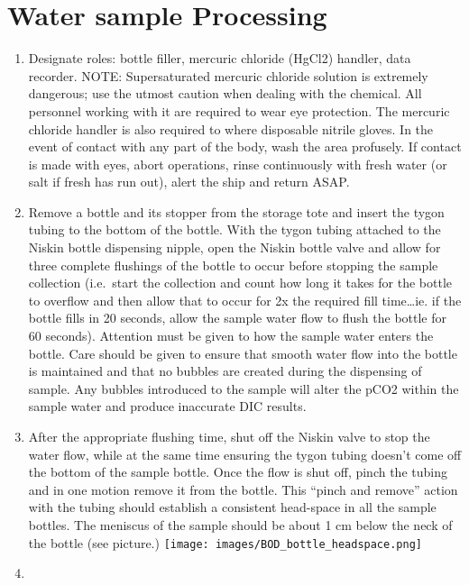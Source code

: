 \documentclass[]{book}
\begin{document}
\section{Water sample Processing}\label{water-sample-processing}

\begin{enumerate}
\def\labelenumi{\arabic{enumi}.}
\item
  Designate roles: bottle filler, mercuric chloride (HgCl2) handler,
  data recorder. NOTE: Supersaturated mercuric chloride solution is
  extremely dangerous; use the utmost caution when dealing with the
  chemical. All personnel working with it are required to wear eye
  protection. The mercuric chloride handler is also required to where
  disposable nitrile gloves. In the event of contact with any part of
  the body, wash the area profusely. If contact is made with eyes, abort
  operations, rinse continuously with fresh water (or salt if fresh has
  run out), alert the ship and return ASAP.
\item
  Remove a bottle and its stopper from the storage tote and insert the
  tygon tubing to the bottom of the bottle. With the tygon tubing
  attached to the Niskin bottle dispensing nipple, open the Niskin
  bottle valve and allow for three complete flushings of the bottle to
  occur before stopping the sample collection (i.e.~start the collection
  and count how long it takes for the bottle to overflow and then allow
  that to occur for 2x the required fill time\ldots{}ie. if the bottle
  fills in 20 seconds, allow the sample water flow to flush the bottle
  for 60 seconds). Attention must be given to how the sample water
  enters the bottle. Care should be given to ensure that smooth water
  flow into the bottle is maintained and that no bubbles are created
  during the dispensing of sample. Any bubbles introduced to the sample
  will alter the pCO2 within the sample water and produce inaccurate DIC
  results.
\item
  After the appropriate flushing time, shut off the Niskin valve to stop
  the water flow, while at the same time ensuring the tygon tubing
  doesn't come off the bottom of the sample bottle. Once the flow is
  shut off, pinch the tubing and in one motion remove it from the
  bottle. This ``pinch and remove'' action with the tubing should
  establish a consistent head-space in all the sample bottles. The
  meniscus of the sample should be about 1 cm below the neck of the
  bottle (see picture.)
  \texttt{[image: images/BOD\_bottle\_headspace.png]}
\item
\end{enumerate}
\end{document}

